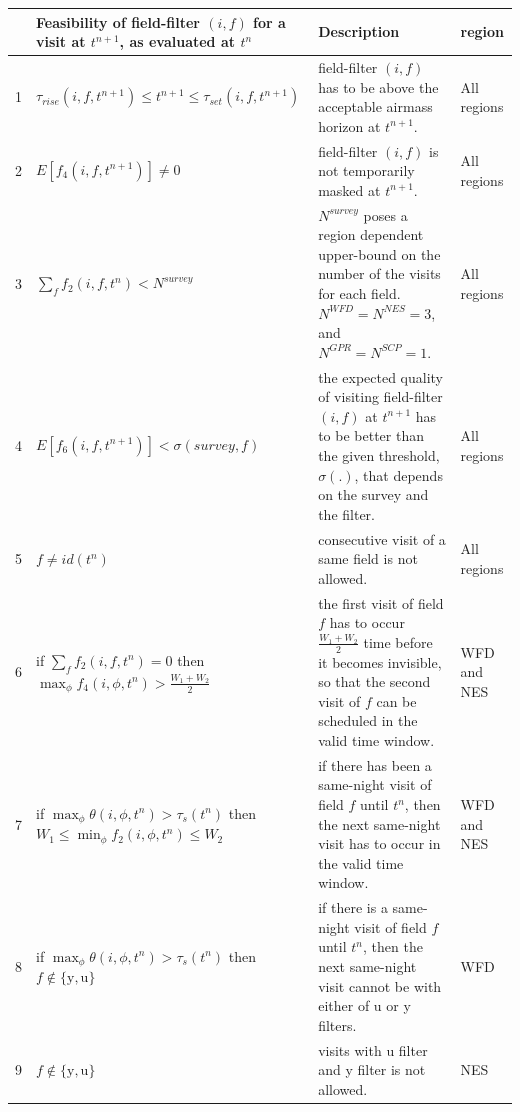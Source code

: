 \documentclass[12pt,aas_macros]{article}
\theoremstyle{definition}
\begin{document}
\begin{table}[h!]
\begin{tabularx}{\textwidth}{| l | X | X | l |}
\hline
& Feasibility of field-filter $(i,f)$ for a visit at $t^{n+1}$, as evaluated at $t^n$& Description & region\\ \hline \hline

1&$ \tau_{rise}(i,f,t^{n+1}) \leq t^{n+1} \leq \tau_{set}(i,f,t^{n+1}) $ & field-filter $(i,f)$ has to be above the acceptable airmass horizon at $t^{n+1}.$ & All regions\\ \hline

2&$ E[f_4(i,f,t^{n+1})] \neq 0 $ & field-filter $(i,f)$ is not temporarily masked at $t^{n+1}$. & All regions\\ \hline

3 & $\sum_{f}f_2(i,f,t^n) < N^{\textit{survey}}$ & $N^{\textit{survey}}$ poses a region dependent upper-bound on the number of the visits for each field. $N^{WFD}= N^{NES} = 3$, and $N^{GPR}= N^{SCP} = 1.$ & All regions\\ \hline

4 & $E[f_6(i,f,t^{n+1})] < \sigma({\textit{survey},f})$ & the expected quality of visiting field-filter $(i,f)$ at $t^{n+1}$ has to be better than the given threshold, $\sigma(.)$, that depends on the survey and the filter. & All regions\\ \hline

5&$f \neq id(t^n)$ & consecutive visit of a same field is not allowed. & All regions\\ \hline

6& if $\sum_{f}f_2(i,f,t^n) = 0$ then \newline $\max_\phi f_4(i,\phi,t^n) > \frac{W_1+W_2}{2}$ & the first visit of field $f$ has to occur $\frac{W_1+W_2}{2}$ time before it becomes invisible, so that the second visit of $f$ can be scheduled in the valid time window. & WFD and NES\\ \hline

7& if $\max_{\phi}\theta(i,\phi,t^n) > \tau_s(t^n)$ then \newline $ W_1 \leq \min_{\phi}f_2(i,\phi,t^n) \leq W_2 $& if there has been a same-night visit of field $f$ until $t^n$, then the next same-night visit has to occur in the valid time window. & WFD and NES\\ \hline

8&if \newline $\max_{\phi}\theta(i,\phi,t^n) > \tau_s(t^n)$ then \newline $f \notin \{\text{y},\text{u}\}$& if there is a same-night visit of field $f$ until $t^n$, then the next same-night visit cannot be with either of u or y filters. & WFD\\ \hline

9& $f \notin \{\text{y},\text{u}\}$ & visits with u filter and y filter is not allowed. & NES\\ \hline

\end{tabularx}
\end{table}\label{tab_feasibility}
\end{document}
